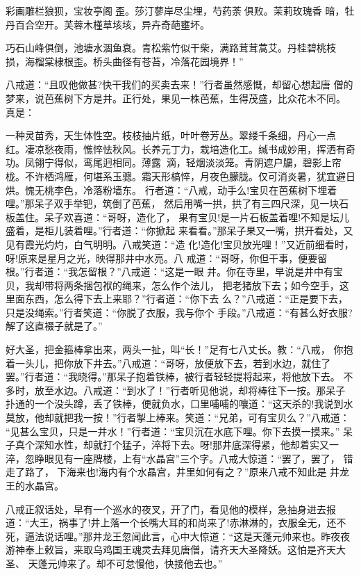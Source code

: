 彩画雕栏狼狈，宝妆亭阁歪。莎汀蓼岸尽尘埋，芍药荼俱败。茉莉玫瑰香
暗，牡丹百合空开。芙蓉木槿草垓垓，异卉奇葩壅坏。

巧石山峰俱倒，池塘水涸鱼衰。青松紫竹似干柴，满路茸茸蒿艾。丹桂碧桃枝
损，海榴棠棣根歪。桥头曲径有苍苔，冷落花园境界！”

八戒道：“且叹他做甚?快干我们的买卖去来！”行者虽然感慨，却留心想起唐
僧的梦来，说芭蕉树下方是井。正行处，果见一株芭蕉，生得茂盛，比众花木不同。
真是：

一种灵苗秀，天生体性空。枝枝抽片纸，叶叶卷芳丛。翠缕千条细，丹心一点
红。凄凉愁夜雨，憔悴怯秋风。长养元丁力，栽培造化工。缄书成妙用，挥洒有奇
功。凤翎宁得似，鸾尾迥相同。薄露滴，轻烟淡淡笼。青阴遮户牖，碧影上帘
栊。不许栖鸿雁，何堪系玉骢。霜天形槁悴，月夜色朦胧。仅可消炎暑，犹宜避日
烘。愧无桃李色，冷落粉墙东。
行者道：“八戒，动手么!宝贝在芭蕉树下埋着哩。”那呆子双手举钯，筑倒了芭蕉，
然后用嘴一拱，拱了有三四尺深，见一块石板盖住。呆子欢喜道：“哥呀，造化了，
果有宝贝!是一片石板盖着哩!不知是坛儿盛着，是柜儿装着哩。”行者道：“你掀起
来看看。”那呆子果又一嘴，拱开看处，又见有霞光灼灼，白气明明。八戒笑道：“造
化!造化!宝贝放光哩！”又近前细看时，呀!原来是星月之光，映得那井中水亮。八
戒道：“哥呀，你但干事，便要留根。”行者道：“我怎留根？”八戒道：“这是一眼
井。你在寺里，早说是井中有宝贝，我却带将两条捆包袱的绳来，怎么作个法儿，
把老猪放下去；如今空手，这里面东西，怎么得下去上来耶？”行者道：“你下去
么？”八戒道：“正是要下去，只是没绳索。”行者笑道：“你脱了衣服，我与你个
手段。”八戒道：“有甚么好衣服?解了这直裰子就是了。”

好大圣，把金箍棒拿出来，两头一扯，叫“长！”足有七八丈长。教：“八戒，
你抱着一头儿，把你放下井去。”八戒道：“哥呀，放便放下去，若到水边，就住了
罢。”行者道：“我晓得。”那呆子抱着铁棒，被行者轻轻提将起来，将他放下去。
不多时，放至水边。八戒道：“到水了！”行者听见他说，却将棒往下一按。那呆子
扑通的一个没头蹲，丢了铁棒，便就负水，口里哺哺的嚷道：“这天杀的!我说到水
莫放，他却就把我一按！”行者掣上棒来。笑道：“兄弟，可有宝贝么？”八戒道：
“见甚么宝贝，只是一井水！”行者道：“宝贝沉在水底下哩。你下去摸一摸来。”
呆子真个深知水性，却就打个猛子，淬将下去。呀!那井底深得紧，他却着实又一
淬，忽睁眼见有一座牌楼，上有“水晶宫”三个字。八戒大惊道：“罢了，罢了，
错走了路了，下海来也!海内有个水晶宫，井里如何有之？”原来八戒不知此是
井龙王的水晶宫。

八戒正叙话处，早有一个巡水的夜叉，开了门，看见他的模样，急抽身进去报
道：“大王，祸事了!井上落一个长嘴大耳的和尚来了!赤淋淋的，衣服全无，还不
死，逼法说话哩。”那井龙王忽闻此言，心中大惊道：“这是天蓬元帅来也。昨夜夜
游神奉上敕旨，来取乌鸡国王魂灵去拜见唐僧，请齐天大圣降妖。这怕是齐天大圣、
天蓬元帅来了。却不可怠慢他，快接他去也。”

